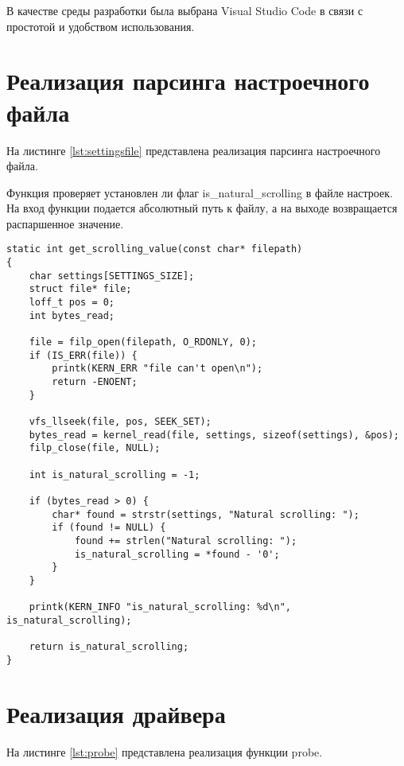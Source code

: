 \documentclass{bmstu}
\begin{document}
В качестве среды разработки была выбрана Visual Studio Code \cite{vscode} в связи с простотой
и удобством использования.


\section{Реализация парсинга настроечного файла}

На листинге \ref{lst:settingsfile} представлена реализация парсинга настроечного файла.

Функция проверяет установлен ли флаг is\_natural\_scrolling в файле настроек.
На вход функции подается абсолютный путь к файлу, а на выходе возвращается распаршенное значение.

\begin{lstlisting}[caption={Реализация функции парсинга настроечного файла}, label=lst:settingsfile]
static int get_scrolling_value(const char* filepath)
{
    char settings[SETTINGS_SIZE];
    struct file* file;
    loff_t pos = 0;
    int bytes_read;

    file = filp_open(filepath, O_RDONLY, 0);
    if (IS_ERR(file)) {
        printk(KERN_ERR "file can't open\n");
        return -ENOENT;
    }

    vfs_llseek(file, pos, SEEK_SET);
    bytes_read = kernel_read(file, settings, sizeof(settings), &pos);
    filp_close(file, NULL);

    int is_natural_scrolling = -1;

    if (bytes_read > 0) {
        char* found = strstr(settings, "Natural scrolling: ");
        if (found != NULL) {
            found += strlen("Natural scrolling: ");
            is_natural_scrolling = *found - '0';
        }
    }

    printk(KERN_INFO "is_natural_scrolling: %d\n", is_natural_scrolling);

    return is_natural_scrolling;
}
\end{lstlisting}

\section{Реализация драйвера}

На листинге \ref{lst:probe} представлена реализация функции probe.
\end{document}
